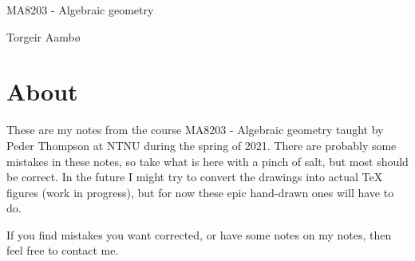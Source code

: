 \begin{titlepage}

    \vspace*{\fill}
    
    \begin{center}
    \Large MA8203 - Algebraic geometry
    \end{center}
    
    
    
    \begin{center}
    Torgeir Aambø
    \end{center}
    
    \vspace{\fill}
    


\section*{About}
These are my notes from the course MA8203 - Algebraic geometry taught by Peder Thompson at NTNU during the spring of 2021. There are probably some mistakes in these notes, so take what is here with a pinch of salt, but most should be correct. In the future I might try to convert the drawings into actual \TeX{}  figures (work in progress), but for now these epic hand-drawn ones will have to do. 

If you find mistakes you want corrected, or have some notes on my notes, then feel free to contact me. 

\listoftodos
    
\vspace{\fill}
    
    

\end{titlepage}